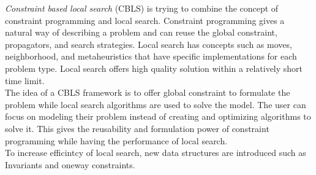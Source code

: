 \emph{Constraint based local search} (CBLS) is trying to combine the concept of constraint programming and local 
search. Constraint programming gives a natural way of describing a problem and can reuse the global constraint, 
propagators, and search strategies. Local search has concepts such as moves, neighborhood, and metaheuristics that have 
specific implementations for each problem type. Local search offers high quality solution within a relatively short time 
limit. \\ 
The idea of a CBLS framework is to offer global constraint to formulate the problem while local search algorithms are 
used to solve the model. The user can focus on modeling their problem instead of creating and optimizing 
algorithms to solve it. This gives the reusability and formulation power of constraint programming while having the 
performance of local search.   \\ 
To increase efficintcy of local search, new data structures are introduced such as Invariants and oneway constraints. 